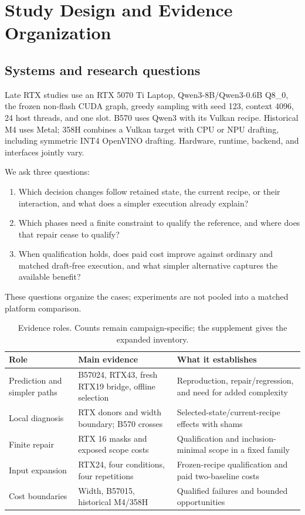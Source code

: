 \section{Study Design and Evidence Organization}
\label{sec:studies}
\subsection{Systems and research questions}
Late RTX studies use an RTX 5070 Ti Laptop, Qwen3-8B/Qwen3-0.6B Q8\_0, the frozen non-flash CUDA graph, greedy sampling with seed 123, context 4096, 24 host threads, and one slot. B570 uses Qwen3 with its Vulkan recipe. Historical M4 uses Metal; 358H combines a Vulkan target with CPU or NPU drafting, including symmetric INT4 OpenVINO drafting. Hardware, runtime, backend, and interfaces jointly vary.

We ask three questions:
\begin{enumerate}
\item Which decision changes follow retained state, the current recipe, or their interaction, and what does a simpler execution already explain?
\item Which phases need a finite constraint to qualify the reference, and where does that repair cease to qualify?
\item When qualification holds, does paid cost improve against ordinary and matched draft-free execution, and what simpler alternative captures the available benefit?
\end{enumerate}
These questions organize the cases; experiments are not pooled into a matched platform comparison.

\begin{table}[t]
\centering\small
\caption{Evidence roles. Counts remain campaign-specific; the supplement gives the expanded inventory.}
\label{tab:studies}
\begin{tabularx}{\linewidth}{@{}p{.20\linewidth}XX@{}}\toprule
Role & Main evidence & What it establishes\\\midrule
Prediction and simpler paths & B57024, RTX43, fresh RTX19 bridge, offline selection & Reproduction, repair/regression, and need for added complexity\\
Local diagnosis & RTX donors and width boundary; B570 crosses & Selected-state/current-recipe effects with shams\\
Finite repair & RTX 16 masks and exposed scope costs & Qualification and inclusion-minimal scope in a fixed family\\
Input expansion & RTX24, four conditions, four repetitions & Frozen-recipe qualification and paid two-baseline costs\\
Cost boundaries & Width, B57015, historical M4/358H & Qualified failures and bounded opportunities\\\bottomrule
\end{tabularx}
\end{table}

